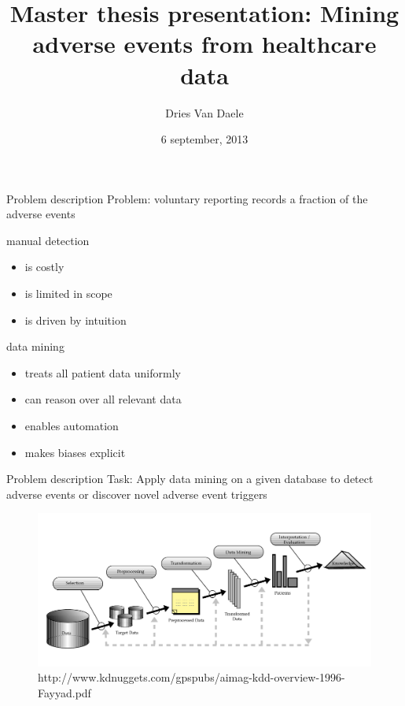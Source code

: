 \message{ !name(presentation.tex)}\documentclass{beamer}
\title[Master thesis presentation: Mining adverse events from healthcare data]
{Master thesis presentation: Mining adverse events from healthcare data}
\author[Dries Van Daele]{Dries Van Daele}
\institute{KU Leuven, DTAI}
\date{6 september, 2013}
\begin{document}


\begin{frame}{}
  \titlepage
\end{frame}

\begin{frame}{Problem description}
Problem: voluntary reporting records a fraction of the adverse events\vspace{3 mm}


manual detection
\begin{itemize}
\item is costly
\item is limited in scope
\item is driven by intuition
\end{itemize}
data mining
\begin{itemize}
\item treats all patient data uniformly
\item can reason over all relevant data
\item enables automation
\item makes biases explicit
\end{itemize}
\end{frame}


\begin{frame}{Problem description}
Task: Apply data mining on a given database to detect adverse events or discover novel adverse event triggers
\begin{figure}
\includegraphics[width=\textwidth,height=.88\textheight,keepaspectratio]{kdd}
{\footnotesize \caption{http://www.kdnuggets.com/gpspubs/aimag-kdd-overview-1996-Fayyad.pdf}}
\end{figure}

\end{frame}


\end{document}
